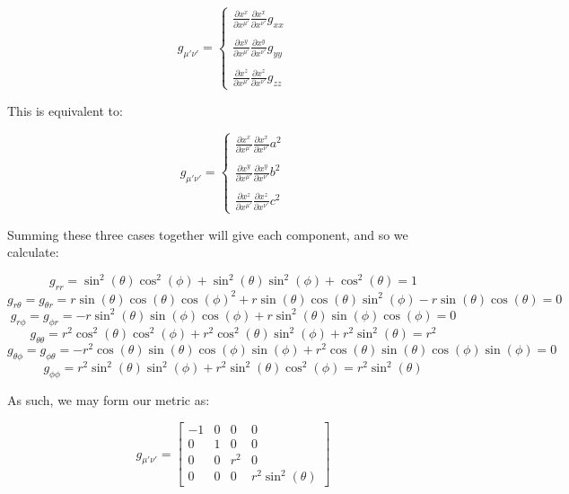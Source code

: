\begin{enumerate}
\begin{enumerate}
        $$g_{\mu'\nu'}=\left\{\begin{array}{l}\frac{\partial x^{x}}{\partial x^{\mu'}}\frac{\partial x^{x}}{\partial x^{\nu'}}g_{xx}\\\\\frac{\partial x^{y}}{\partial x^{\mu'}}\frac{\partial x^{y}}{\partial x^{\nu'}}g_{yy}\\\\\frac{\partial x^{z}}{\partial x^{\mu'}}\frac{\partial x^{z}}{\partial x^{\nu'}}g_{zz}\end{array}$$

          This is equivalent to:

        $$g_{\mu'\nu'}=\left\{\begin{array}{l}\frac{\partial x^{x}}{\partial x^{\mu'}}\frac{\partial x^{x}}{\partial x^{\nu'}}a^2\\\\\frac{\partial x^{y}}{\partial x^{\mu'}}\frac{\partial x^{y}}{\partial x^{\nu'}}b^2\\\\\frac{\partial x^{z}}{\partial x^{\mu'}}\frac{\partial x^{z}}{\partial x^{\nu'}}c^2\end{array}$$

          Summing these three cases together will give each component, and so we calculate:

          $$g_{rr}=\sin^2(\theta)\cos^2(\phi)+\sin^2(\theta)\sin^2(\phi)+\cos^2(\theta)=1$$
          $$g_{r\theta}=g_{\theta r}=r\sin(\theta)\cos(\theta)\cos(\phi)^2+r\sin(\theta)\cos(\theta)\sin^2(\phi)-r\sin(\theta)\cos(\theta)=0$$
          $$g_{r\phi}=g_{\phi r}=-r\sin^2(\theta)\sin(\phi)\cos(\phi)+r\sin^2(\theta)\sin(\phi)\cos(\phi)=0$$
          $$g_{\theta\theta}=r^2\cos^2(\theta)\cos^2(\phi)+r^2\cos^2(\theta)\sin^2(\phi)+r^2\sin^2(\theta)=r^2$$
          $$g_{\theta\phi}=g_{\phi\theta}=-r^2\cos(\theta)\sin(\theta)\cos(\phi)\sin(\phi)+r^2\cos(\theta)\sin(\theta)\cos(\phi)\sin(\phi)=0$$
          $$g_{\phi\phi}=r^2\sin^2(\theta)\sin^2(\phi)+r^2\sin^2(\theta)\cos^2(\phi)=r^2\sin^2(\theta)$$

          As such, we may form our metric as:

          $$\boxed{g_{\mu'\nu'}=\left[ \begin{matrix}-1 & 0 & 0 & 0\\ 0 & 1 & 0 & 0\\ 0 & 0 & r^2 & 0\\ 0 & 0 & 0 & r^2\sin^2(\theta)\end{matrix} \right]}$$


\end{enumerate}
\end{enumerate}

